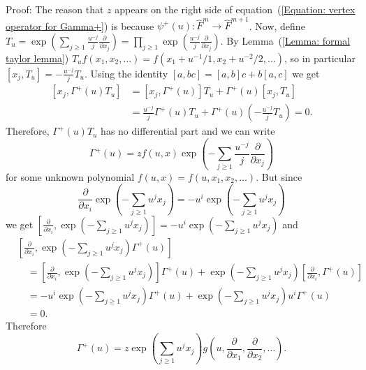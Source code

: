 Proof: The reason that $z$ appears on the right side of equation~(\ref{Equation: vertex operator for Gamma+}) is because $\psi^+(u): \hat{F}^m\rightarrow \hat{F}^{m+1}$. Now, define $ T_u=\exp\left(\sum_{j\geq1}\frac{u^{-j}}{j}\frac{\partial}{\partial x_j}\right)=\prod_{j\geq1}\exp(\frac{u^{-j}}{j}\frac{\partial}{\partial x_j})$. By Lemma~(\ref{Lemma: formal taylor lemma}) $T_uf(x_1,x_2,\dots)=f(x_1+u^{-1}/1,x_2+u^{-2}/2,\dots)$, so in particular $[x_j,T_u]=-\frac{u^{-j}}{j}T_u$. Using the identity $[a,bc]=[a,b]c+b[a,c]$ we get
\begin{equation}
\begin{split}
    [x_j,\Gamma^+(u)T_u]&=[x_j,\Gamma^+(u)]T_u+\Gamma^+(u)[x_j,T_u]\\
    &=\frac{u^{-j}}{j}\Gamma^+(u)T_u+\Gamma^+(u)\left(-\frac{u^{-j}}{j}T_u\right)=0.
\end{split}
\end{equation}
Therefore, $\Gamma^+(u)T_u$ has no differential part and we can write
\begin{equation}\label{Equation: vertex 1}
    \Gamma^+(u)=zf(u,x)\exp\left(-\sum_{j\geq1}\frac{u^{-j}}{j}\frac{\partial}{\partial x_j}\right)
\end{equation}
for some unknown polynomial $f(u,x)=f(u,x_1,x_2,\dots)$. But since 
\[
\frac{\partial}{\partial x_i}\exp\left(-\sum_{j\geq1}u^jx_j\right)=-u^i\exp\left(-
\sum_{j\geq1}u^jx_j\right)
\]
we get $\left[\frac{\partial}{\partial x_i}, \exp\left(-\sum_{j\geq1}u^jx_j\right)\right]=-u^i\exp\left(-\sum_{j\geq1}u^jx_j\right)$ and
\begin{equation}
    \begin{split}
        &\left[\frac{\partial}{\partial x_i}, \exp\left(-\sum_{j\geq1}u^jx_j\right)\Gamma^+(u)\right]\\
        &\quad=\left[\frac{\partial}{\partial x_i}, \exp\left(-\sum_{j\geq1}u^jx_j\right)\right]\Gamma^+(u)+\exp\left(-\sum_{j\geq1}u^jx_j\right)\left[\frac{\partial}{\partial x_i},\Gamma^+(u)\right]\\
        &\quad=-u^i\exp\left(-\sum_{j\geq1}u^jx_j\right)\Gamma^+(u)+\exp\left(-\sum_{j\geq1}u^jx_j\right)u^i\Gamma^+(u)\\
        &\quad=0.
    \end{split}
\end{equation}
Therefore
\begin{equation}\label{Equation: vertex 2}
    \Gamma^+(u)=z\exp\left(\sum_{j\geq1}u^jx_j\right)g\left(u, \frac{\partial}{\partial x_1},\frac{\partial}{\partial x_2},\dots\right).
\end{equation}
